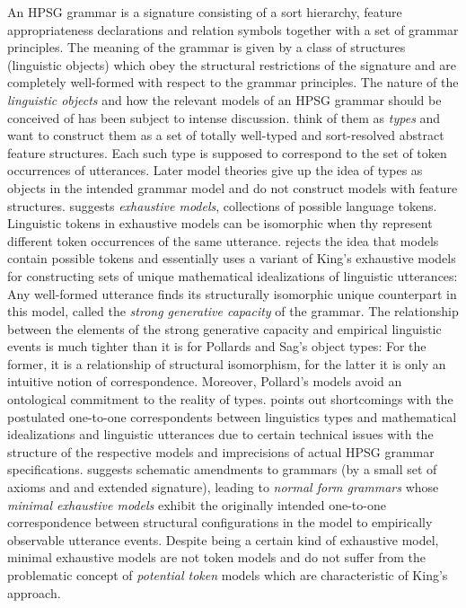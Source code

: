 \documentclass[output=paper
                ,modfonts
                ,nonflat
	        ,collection
	        ,collectionchapter
	        ,collectiontoclongg
 	        ,biblatex
                ,babelshorthands
                ,newtxmath
                ,draftmode
                ,colorlinks, citecolor=brown
]{./langsci/langscibook}
\begin{document}
{{An HPSG grammar is a signature consisting of a sort hierarchy, feature
appropriateness declarations and relation symbols together with a set
of grammar principles. The meaning of the grammar is given by a class
of structures (linguistic objects) which obey the structural
restrictions of the signature and are completely well-formed with
respect to the grammar principles. The nature of the \emph{linguistic
  objects} and how the relevant models of an HPSG grammar should be
conceived of has been subject to intense
discussion. \cite{PollardSag1994} think of them as \emph{types} and
want to construct them as a set of totally well-typed and
sort-resolved abstract feature structures. Each such type is supposed
to correspond to the set of token occurrences of utterances.  Later
model theories give up the idea of types as objects in the intended
grammar model and do not construct models with feature
structures. \citet{King99a-u} suggests \emph{exhaustive models},
collections of possible language tokens.  Linguistic tokens in
exhaustive models can be isomorphic when thy represent different token
occurrences of the same utterance. \citet{Pollard99a} rejects the idea
that models contain possible tokens and essentially uses a variant of
King's exhaustive models for constructing sets of unique mathematical
idealizations of linguistic utterances: Any well-formed utterance
finds its structurally isomorphic unique counterpart in this model,
called the \emph{strong generative capacity} of the grammar. The
relationship between the elements of the strong generative capacity
and empirical linguistic events is much tighter than it is for
Pollards and Sag's object types: For the former, it is a relationship
of structural isomorphism, for the latter it is only an intuitive
notion of correspondence. Moreover, Pollard's models avoid an
ontological commitment to the reality of types. \citet{Richter2007a}
points out shortcomings with the postulated one-to-one correspondents
between linguistics types \citep{PollardSag1994} and mathematical
idealizations \citep{Pollard99a} and linguistic utterances due to
certain technical issues with the structure of the respective models
and imprecisions of actual HPSG grammar
specifications. \citet{Richter2007a} suggests schematic amendments to
grammars (by a small set of axioms and and extended signature),
leading to \emph{normal form grammars} whose \emph{minimal exhaustive
  models} exhibit the originally intended one-to-one correspondence
between structural configurations in the model to empirically
observable utterance events. Despite being a certain kind of
exhaustive model, minimal exhaustive models are not token models and
do not suffer from the problematic concept of \emph{potential token} models which are
characteristic of King's approach.

}}
\end{document}
